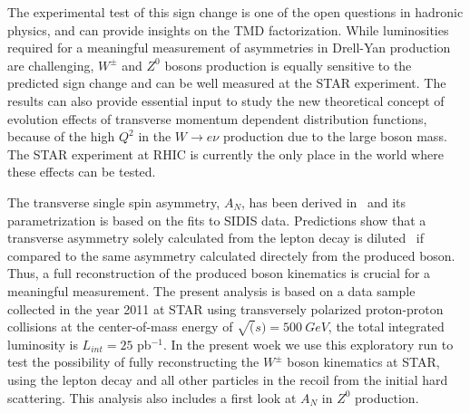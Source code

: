 \documentclass[12pt]{article}
\begin{document}
The experimental test of this sign change is one of the open questions in hadronic physics, and can provide insights on the TMD factorization. While luminosities required for a meaningful measurement of asymmetries in Drell-Yan production are challenging, $W^{\pm}$ and $Z^{0}$ bosons production is equally sensitive to the predicted sign change and can be well measured at the STAR experiment.  The results can also provide essential input to study the new theoretical concept of evolution effects of transverse momentum dependent distribution functions, because of the high $Q^{2}$ in the $W\rightarrow e \nu$ production due to the large boson mass. The STAR experiment at RHIC is currently the only place in the world where these effects can be tested.

The transverse single spin asymmetry, $A_N$, has been derived in~\cite{Kang:2009bp} and its parametrization is based on the fits to SIDIS data.
Predictions show that a transverse asymmetry solely calculated from the lepton decay is diluted~\cite{Kang:2009bp} if compared to the same asymmetry calculated directely from the produced boson. 
Thus, a full reconstruction of the produced boson kinematics is crucial for a meaningful measurement.
The present analysis is based on a data sample collected in the year 2011 at STAR using transversely polarized proton-proton collisions at the center-of-mass energy of $\sqrt(s)=500~GeV$, the total integrated luminosity is $L_{int} = 25$ pb$^{-1}$. In the present woek we use this exploratory run to test the possibility of fully reconstructing the $W^{\pm}$ boson kinematics at STAR, using the lepton decay and all other particles in the recoil from the initial hard scattering. This analysis also includes a first look at $A_{N}$ in $Z^{0}$ production. 

%
%
%
\end{document}
